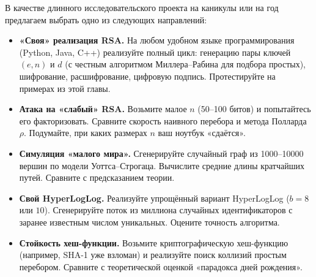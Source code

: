 В качестве длинного исследовательского проекта на каникулы или на год предлагаем выбрать одно из следующих направлений:

\begin{itemize}
  \item \textbf{«Своя» реализация RSA.} На любом удобном языке программирования (Python, Java, C++) реализуйте полный цикл: генерацию пары ключей $(e, n)$ и $d$ (с честным алгоритмом Миллера--Рабина для подбора простых), шифрование, расшифрование, цифровую подпись. Протестируйте на примерах из этой главы.
  \item \textbf{Атака на «слабый» RSA.} Возьмите малое $n$ (50--100 битов) и попытайтесь его факторизовать. Сравните скорость наивного перебора и метода Полларда $\rho$. Подумайте, при каких размерах $n$ ваш ноутбук «сдаётся».
  \item \textbf{Симуляция «малого мира».} Сгенерируйте случайный граф из 1000--10000 вершин по модели Уоттса--Строгаца. Вычислите средние длины кратчайших путей. Сравните с предсказанием теории.
  \item \textbf{Свой HyperLogLog.} Реализуйте упрощённый вариант HyperLogLog ($b = 8$ или $10$). Сгенерируйте поток из миллиона случайных идентификаторов с заранее известным числом уникальных. Оцените точность алгоритма.
  \item \textbf{Стойкость хеш-функции.} Возьмите криптографическую хеш-функцию (например, SHA-1 уже взломан) и реализуйте поиск коллизий простым перебором. Сравните с теоретической оценкой «парадокса дней рождения».
\end{itemize}
